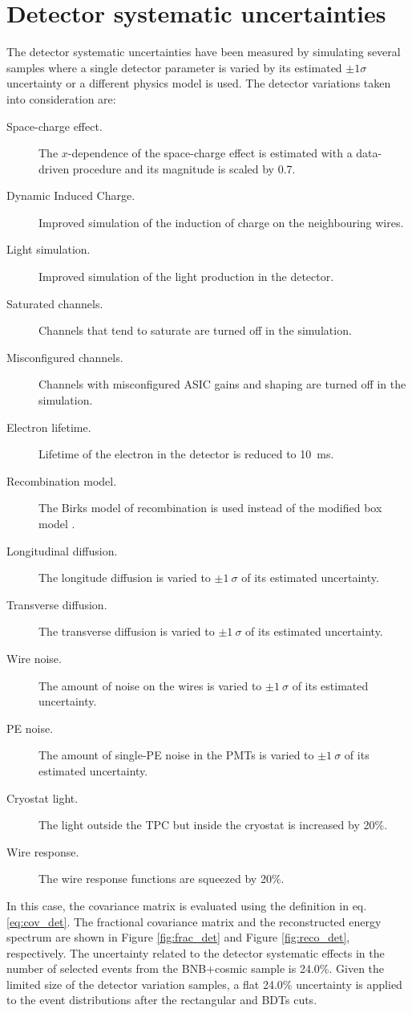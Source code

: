 \section{Detector systematic uncertainties}
The detector systematic uncertainties have been measured by simulating several samples where a single detector parameter is varied by its estimated $\pm1\sigma$ uncertainty or a different physics model is used. The detector variations taken into consideration are:
\begin{description}
\item[Space-charge effect.] The $x$-dependence of the space-charge effect is estimated with a data-driven procedure and its magnitude is scaled by 0.7.
\item[Dynamic Induced Charge.] Improved simulation of the induction of charge on the neighbouring wires.
\item[Light simulation.] Improved simulation of the light production in the detector.
\item[Saturated channels.] Channels that tend to saturate are turned off in the simulation.
\item[Misconfigured channels.] Channels with misconfigured ASIC gains and shaping are turned off in the simulation.
\item[Electron lifetime.] Lifetime of the electron in the detector is reduced to 10~ms.
\item[Recombination model.] The Birks model of recombination \cite{Amoruso:2004dy} is used instead of the modified box model \cite{Acciarri:2013met}. 
\item[Longitudinal diffusion.] The longitude diffusion is varied to $\pm1~\sigma$ of its estimated uncertainty.
\item[Transverse diffusion.] The transverse diffusion is varied to $\pm1~\sigma$ of its estimated uncertainty.
\item[Wire noise.] The amount of noise on the wires is varied to $\pm1~\sigma$ of its estimated uncertainty.
\item[PE noise.] The amount of single-PE noise in the PMTs is varied to $\pm1~\sigma$ of its estimated uncertainty.
\item[Cryostat light.] The light outside the TPC but inside the cryostat is increased by 20\%.
\item[Wire response.] The wire response functions are squeezed by 20\%.
\end{description}

In this case, the covariance matrix is evaluated using the definition in eq. \eqref{eq:cov_det}. The fractional covariance matrix and the reconstructed energy spectrum are shown in Figure \ref{fig:frac_det} and Figure \ref{fig:reco_det}, respectively.
The uncertainty related to the detector systematic effects in the number of selected events from the BNB+cosmic sample is 24.0\%. Given the limited size of the detector variation samples, a flat 24.0\% uncertainty is applied to the event distributions after the rectangular and BDTs cuts.

